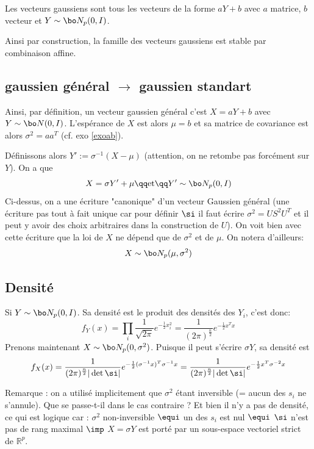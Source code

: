 \documentclass{article}
\begin{document}
\begin{definition}
Les vecteurs gaussiens sont tous les vecteurs de la forme $a Y+b$ avec $a$ matrice, $b$ vecteur et $Y\sim\bo N_p(0,I)$. 
\end{definition}

 Ainsi par construction, la famille des vecteurs gaussiens est stable par combinaison affine. 



\subsection{ gaussien général $\to$ gaussien standart}

Ainsi, par définition, un vecteur gaussien général c'est $X= aY + b$ avec $Y \sim \bo N(0,I)$.  L'espérance de $X$ est alors $\mu = b$ et  sa matrice de covariance est alors $\sigma^2 = a a^T$ (cf. exo \ref{exoab}).  

Définissons alors $Y' := \sigma^{-1} (X-\mu)$ (attention, on ne retombe pas forcément sur $Y$).  On a que 
$$
X = \sigma Y' + \mu   \qq \mathrm{ et } \qq Y' \sim \bo N_p(0,I)
$$ 
Ci-dessus, on a une écriture "canonique" d'un vecteur Gaussien général (une écriture pas tout à fait unique car pour définir $\si$ il faut écrire $\sigma^2 = US^2 U^T$ et il peut y avoir des choix arbitraires  dans la construction de  $U$).   On voit bien avec cette écriture que la loi de $X$ ne dépend que de $\sigma^2$ et de $\mu$. On notera d'ailleurs:
$$
X \sim \bo N_p(\mu, \sigma^2)
$$ 



\subsection{Densité}

Si $Y\sim \bo N_p(0,I) $. Sa densité est le produit des densités des $Y_i$, c'est donc:
$$
f_Y(x)= \prod_i  \frac 1 {\sqrt{2\pi}}   e^{-\frac 1 2    x_i^2}  =  \frac 1 { (2\pi)^{\frac  n 2 }}   e^{-\frac 1 2  x^T  x }   
$$
Prenons maintenant $X \sim \bo N_p(0 ,\sigma^2)$. Puisque il peut s'écrire $\sigma Y$, sa densité est
$$
f_X(x) = \frac 1 { (2\pi)^{\frac  n 2 }   |\det \si|   }     e^{-\frac 1 2   (\sigma^{-1} x)^T   {\sigma^{-1} x} }     = \frac 1 { (2\pi)^{\frac  n 2 }   |\det \si|   }     e^{-\frac 1 2  x^{T}  \sigma^{-2}  {x} }   
$$

Remarque : on a utilisé implicitement que $\sigma^2$ étant inversible (= aucun des $s_i$ ne s'annule). Que se passe-t-il dans le cas contraire ? Et bien il n'y a pas de densité, ce qui est logique car : $\sigma^2$ non-inversible $\equi$  un des $s_i$ est nul $\equi$   $\si$ n'est pas de rang maximal  $\imp$    $X=\sigma Y$ est  porté par un sous-espace vectoriel strict de $\mathbb R^p$. 
\end{document}
